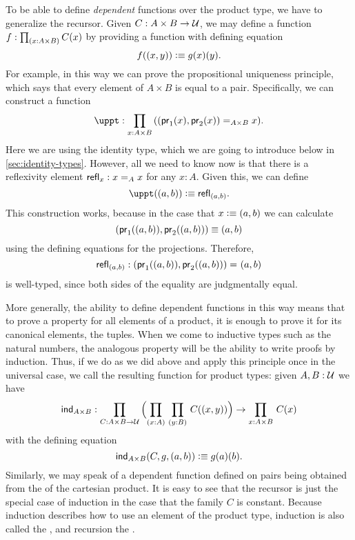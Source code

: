To be able to define \emph{dependent} functions over the product type, we have
to generalize the recursor. Given $C: A \times B \to \UU$, we may
define a function $f : \prd{x : A \times B} C(x)$ by providing a
function
with defining equation
\[ f(\tup x y) \defeq g(x)(y). \] 
For example, in this way we can prove the propositional uniqueness principle, which says that every element of $A\times B$ is equal to a pair.
%
Specifically, we can construct a function
\[ \uppt : \prd{x:A \times B} (\id[A\times B]{\tup{\fst {(x)}}{\snd {(x)}}}{x}). \]
Here we are using the identity type, which we are going to introduce below in \cref{sec:identity-types}.
However, all we need to know now is that there is a reflexivity element $\refl{x} : \id[A]{x}{x}$ for any $x:A$.
Given this, we can define
\[ \uppt(\tup{a}{b}) \defeq \refl{\tup{a}{b}}. \]
This construction works, because in the case that $x \defeq \tup{a}{b}$ we can 
calculate 
\[ \tup{\fst(\tup{a}{b})}{\snd{(\tup{a}{b})}} \jdeq \tup{a}{b} \]
using the defining equations for the projections. Therefore,
\[ \refl{\tup{a}{b}} : \id{\tup{\fst(\tup{a}{b})}{\snd{(\tup{a}{b})}}}{\tup{a}{b}} \]
is well-typed, since both sides of the equality are judgmentally equal.

More generally, the ability to define dependent functions in this way means that to prove a property for all elements of a product, it is enough 
to prove it for its canonical elements, the tuples.
When we come to inductive types such as the natural numbers, the analogous property will be the ability to write proofs by induction.
Thus, if we do as we did above and apply this principle once in the universal case, we call the resulting function  for product types: given $A,B : \UU$ we have
%
\[ \ind{A\times B} : \prd{C:A \times B \to \UU}
\Parens{\prd{x:A}{y:B} C(\tup{x}{y})} \to \prd{x:A \times B} C(x) \]
with the defining equation 
\[ \ind{A\times B}(C,g,\tup{a}{b}) \defeq g(a)(b). \]
Similarly, we may speak of a dependent function defined on pairs being obtained from the 
%
%
of the cartesian product.
It is easy to see that the recursor is just the special case of induction
in the case that the family $C$ is constant.
Because induction describes how to use an element of the product type, induction is also called the ,
%
and recursion the .
%
%
%

